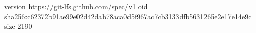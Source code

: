 version https://git-lfs.github.com/spec/v1
oid sha256:c62372b91ae99e02d42dab78aca0d5f967ac7cb3133dfb5631265e2e17e14e9c
size 2190
